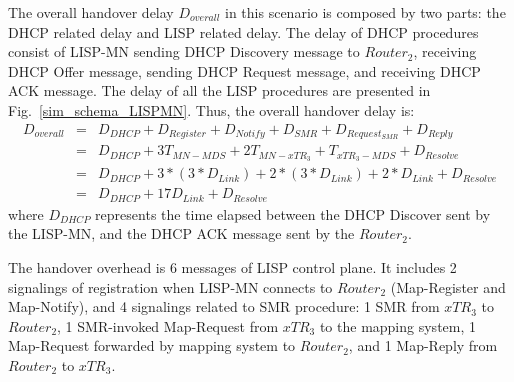 The overall handover delay $D_{overall}$ in this scenario is composed by two parts: the DHCP related delay and LISP related delay. The delay of DHCP procedures consist of LISP-MN sending DHCP Discovery message to $Router_2$, receiving DHCP Offer message, sending DHCP Request message, and receiving DHCP ACK message. The delay of all the LISP procedures are presented in Fig.~\ref{sim_schema_LISPMN}. Thus, the overall handover delay is:
\begin{eqnarray}
D_{overall} &=& D_{DHCP} + D_{Register} + D_{Notify} + D_{SMR} + D_{Request_{SMR}} + D_{Reply} \nonumber \\
&=& D_{DHCP} + 3T_{MN-MDS} + 2T_{MN-xTR_3} + T_{xTR_3-MDS} + D_{Resolve} \nonumber \\
&=& D_{DHCP} + 3* (3*D_{Link}) + 2*(3*D_{Link}) + 2*D_{Link} + D_{Resolve}\nonumber \\
&=& D_{DHCP} + 17D_{Link} + D_{Resolve}
\end{eqnarray}
where $D_{DHCP}$ represents the time elapsed between the DHCP Discover sent by the LISP-MN, and the DHCP ACK message sent by the $Router_2$. %

The handover overhead is 6 messages of LISP control plane. It includes 2 signalings of registration when LISP-MN connects to $Router_2$ (Map-Register and Map-Notify), and 4 signalings related to SMR procedure: 1 SMR from $xTR_3$ to $Router_2$, 1 SMR-invoked Map-Request from $xTR_3$ to the mapping system, 1 Map-Request forwarded by mapping system to $Router_2$, and 1 Map-Reply from $Router_2$ to $xTR_3$.

